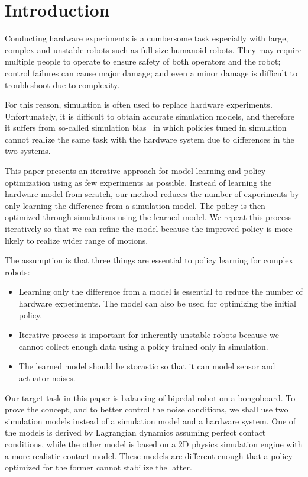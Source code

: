 \documentclass[letterpaper, 10 pt, conference]{ieeeconf}
\begin{document}
\newlength{\figw}
\newlength{\figh}

\section{Introduction}

Conducting hardware experiments is a cumbersome task especially with
large, complex and unstable robots such as full-size humanoid robots.
They may require multiple people to operate to ensure safety of both
operators and the robot; control failures can cause major damage; and even
a minor damage is difficult to troubleshoot due to complexity.

For this reason, simulation is often used to replace hardware
experiments. 
Unfortunately, it is difficult to obtain accurate simulation
models, and therefore it suffers from so-called simulation bias~\cite{bib-kober-survey} in which 
policies tuned in simulation cannot realize the same task with the
hardware system due to differences in the two systems.

This paper presents an iterative approach for model learning and
policy optimization using as few experiments as possible.
Instead of learning the hardware model from scratch, our method reduces
the number of experiments by only learning the difference from a
simulation model.
The policy is then optimized through simulations using the learned
model.
We repeat this process iteratively so that we can refine the model
because the improved policy is more likely to realize wider range of
motions.

The assumption is that three things are essential to policy learning for
complex robots:
\begin{itemize}
\item Learning only the difference from a model is essential to reduce
the number of hardware experiments.  The model can also be used 
	  for optimizing the initial policy.
\item Iterative process is important for inherently unstable robots because
	  we cannot collect enough data using a policy trained only in simulation.
\item The learned model should be stocastic so that it can model
	  sensor and actuator noises.
\end{itemize}

Our target task in this paper is balancing of bipedal robot on a
bongoboard.
To prove the concept, and to better control the noise conditions, we shall use
two simulation models instead of a simulation model and a hardware system.
One of the models is derived by Lagrangian dynamics assuming perfect
contact conditions, while the other model is based on a 2D physics
simulation engine with a more realistic contact model.
These models are different enough that a policy optimized
for the former cannot stabilize the latter.
\end{document}
